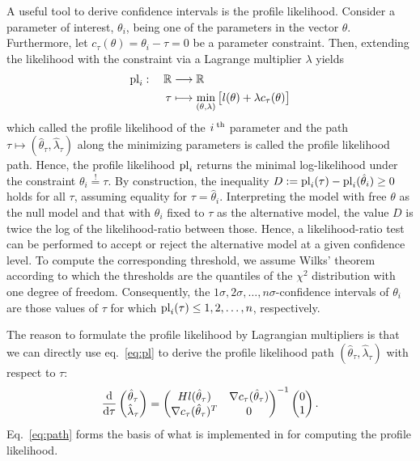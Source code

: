 \documentclass[article]{jss}
\begin{document}
A useful tool to derive confidence intervals is the profile likelihood. Consider a parameter of interest, $\theta_i$, being one of the parameters in the vector $\theta$. Furthermore, let $c_{\tau}(\theta) = \theta_i - \tau = 0$ be a parameter constraint. 
Then, extending the likelihood with the constraint via a Lagrange multiplier $\lambda$ yields
\begin{align}
	\begin{aligned}
		{\rm pl}_i:\quad \mathbb R & \longrightarrow \mathbb R\\
		\tau & \longmapsto \min_{(\theta, \lambda)} \big[ l(\theta) + \lambda c_{\tau}(\theta) \big]
	\end{aligned}
	\label{eq:pl}
\end{align}
which called the profile likelihood of the $i^{\;\rm th}$ parameter and the path $\tau \mapsto (\hat\theta_{\tau}, \hat\lambda_{\tau})$ along the minimizing parameters is called the profile likelihood path. Hence, the profile likelihood ${\rm pl}_i$ returns the minimal log-likelihood under the constraint $\theta_i \stackrel{!}{=} \tau$. By construction, the inequality $D := {\rm pl}_i(\tau) - {\rm pl}_i(\hat \theta_i) \geq 0$ holds for all $\tau$, assuming equality for $\tau = \hat\theta_i$. Interpreting the model with free $\theta$ as the null model and that with $\theta_i$ fixed to $\tau$ as the alternative model, the value $D$ is twice the log of the likelihood-ratio between those. Hence, a likelihood-ratio test can be performed to accept or reject the alternative model at a given confidence level. To compute the corresponding threshold, we assume Wilks' theorem according to which the thresholds are the quantiles of the $\chi^2$ distribution with one degree of freedom. Consequently, the $1\sigma, 2\sigma, \dots, n\sigma$-confidence intervals of $\theta_i$ are those values of $\tau$ for which ${\rm pl}_i(\tau) \leq 1, 2, \dots, n$, respectively. 

The reason to formulate the profile likelihood by Lagrangian multipliers is that we can directly use eq.~\eqref{eq:pl} to derive the profile likelihood path $(\hat \theta_{\tau}, \hat\lambda_{\tau})$ with respect to $\tau$:
\begin{align} 
	\frac{\rm d}{{\rm d} \tau}
	\begin{pmatrix}
		\hat\theta_{\tau} \\ \hat\lambda_{\tau}
	\end{pmatrix} =
	\begin{pmatrix}
		Hl(\hat\theta_{\tau}) & \nabla c_{\tau}(\hat \theta_{\tau})\\
		\nabla c_{\tau}(\hat\theta_{\tau})^T & 0
	\end{pmatrix}^{-1}
	\begin{pmatrix}
		0 \\ 1
	\end{pmatrix}.
	\label{eq:path}
\end{align}
Eq.~\eqref{eq:path} forms the basis of what is implemented in  for computing the profile likelihood.
\end{document}
